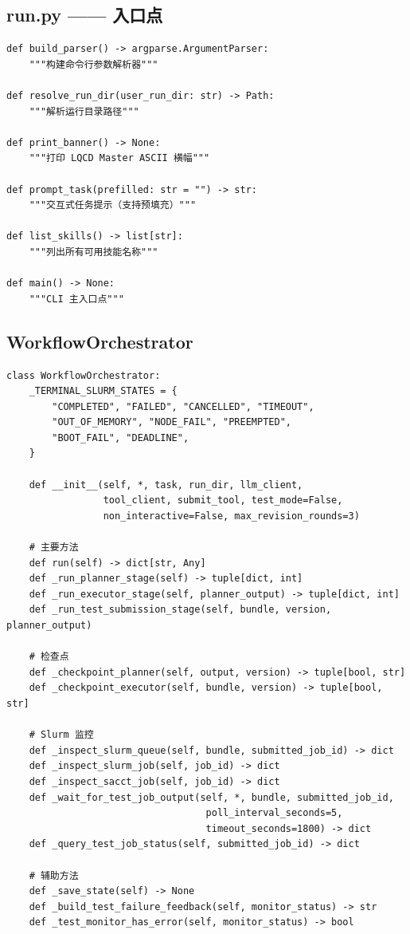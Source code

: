 \documentclass[12pt,a4paper]{ctexart}
\begin{document}
\subsection{run.py —— 入口点}

\begin{lstlisting}[style=pycode]
def build_parser() -> argparse.ArgumentParser:
    """构建命令行参数解析器"""

def resolve_run_dir(user_run_dir: str) -> Path:
    """解析运行目录路径"""

def print_banner() -> None:
    """打印 LQCD Master ASCII 横幅"""

def prompt_task(prefilled: str = "") -> str:
    """交互式任务提示（支持预填充）"""

def list_skills() -> list[str]:
    """列出所有可用技能名称"""

def main() -> None:
    """CLI 主入口点"""
\end{lstlisting}

\subsection{WorkflowOrchestrator}

\begin{lstlisting}[style=pycode]
class WorkflowOrchestrator:
    _TERMINAL_SLURM_STATES = {
        "COMPLETED", "FAILED", "CANCELLED", "TIMEOUT",
        "OUT_OF_MEMORY", "NODE_FAIL", "PREEMPTED",
        "BOOT_FAIL", "DEADLINE",
    }

    def __init__(self, *, task, run_dir, llm_client,
                 tool_client, submit_tool, test_mode=False,
                 non_interactive=False, max_revision_rounds=3)

    # 主要方法
    def run(self) -> dict[str, Any]
    def _run_planner_stage(self) -> tuple[dict, int]
    def _run_executor_stage(self, planner_output) -> tuple[dict, int]
    def _run_test_submission_stage(self, bundle, version, planner_output)

    # 检查点
    def _checkpoint_planner(self, output, version) -> tuple[bool, str]
    def _checkpoint_executor(self, bundle, version) -> tuple[bool, str]

    # Slurm 监控
    def _inspect_slurm_queue(self, bundle, submitted_job_id) -> dict
    def _inspect_slurm_job(self, job_id) -> dict
    def _inspect_sacct_job(self, job_id) -> dict
    def _wait_for_test_job_output(self, *, bundle, submitted_job_id,
                                   poll_interval_seconds=5,
                                   timeout_seconds=1800) -> dict
    def _query_test_job_status(self, submitted_job_id) -> dict

    # 辅助方法
    def _save_state(self) -> None
    def _build_test_failure_feedback(self, monitor_status) -> str
    def _test_monitor_has_error(self, monitor_status) -> bool
\end{lstlisting}
\end{document}
